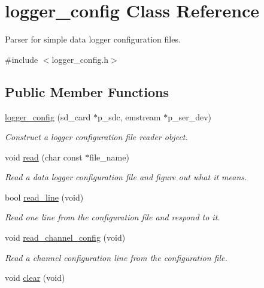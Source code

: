 \hypertarget{classlogger__config}{\section{logger\-\_\-config Class Reference}
\label{classlogger__config}
}


Parser for simple data logger configuration files.  




{\ttfamily \#include $<$logger\-\_\-config.\-h$>$}

\subsection*{Public Member Functions}
\begin{DoxyCompactItemize}
\item 
\hyperlink{classlogger__config_acd6780a9ad347c4adedf2fe2ceb22757}{logger\-\_\-config} (sd\-\_\-card $\ast$p\-\_\-sdc, emstream $\ast$p\-\_\-ser\-\_\-dev)
\begin{DoxyCompactList}\small\item\em Construct a logger configuration file reader object. \end{DoxyCompactList}\item 
void \hyperlink{classlogger__config_a79c7dfd8b1fc2058724e0e0cb4b22ddb}{read} (char const $\ast$file\-\_\-name)
\begin{DoxyCompactList}\small\item\em Read a data logger configuration file and figure out what it means. \end{DoxyCompactList}\item 
bool \hyperlink{classlogger__config_a6bc93719808abe5135dc4abf8656f4b7}{read\-\_\-line} (void)
\begin{DoxyCompactList}\small\item\em Read one line from the configuration file and respond to it. \end{DoxyCompactList}\item 
void \hyperlink{classlogger__config_aeb468fb4654befe3e07c993760ed5d74}{read\-\_\-channel\-\_\-config} (void)
\begin{DoxyCompactList}\small\item\em Read a channel configuration line from the configuration file. \end{DoxyCompactList}\item 
void \hyperlink{classlogger__config_a30f5e9607e7207984ab80ecba9ffcdf4}{clear} (void)

\end{DoxyCompactItemize}
